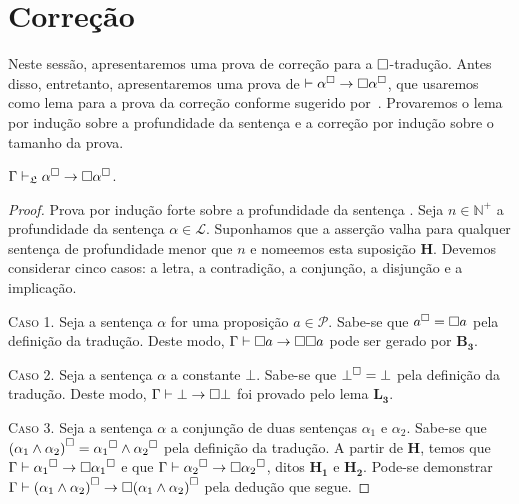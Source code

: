 \section{Correção}

    Neste sessão, apresentaremos uma prova de correção para a $\Box$-tradução. Antes disso, entretanto, apresentaremos uma prova de $\mathrel{\vdash}\alpha^\Box\to\Box\alpha^\Box$, que usaremos como lema para a prova da correção conforme sugerido por~\cite{Troelstra}. Provaremos o lema por indução sobre a profundidade da sentença e a correção por indução sobre o tamanho da prova.

    \begin{tcolorbox}[enhanced jigsaw, breakable, sharp corners, colframe=black, colback=white, boxrule=0.5pt, left=1.5mm, right=1.5mm, top=1.5mm, bottom=1.5mm]
    \begin{theorem}[Estabilidade]\label{square-nec}
        $\Gamma\mathrel{\vdash}_\mathfrak{L}\alpha^\Box\to\Box\alpha^\Box$.

        \begin{proof}
            Prova por indução forte sobre a profundidade da sentença \citep{Troelstra}.
            Seja $n\in\mathbb{N}^+$ a profundidade da sentença $\alpha\in\mathcal{L}$.
            Suponhamos que a asserção valha para qualquer sentença de profundidade menor que $n$ e nomeemos esta suposição $\mathbf{H}$.
            Devemos considerar cinco casos: a letra, a contradição, a conjunção, a disjunção e a implicação.

            \vspace{.5\baselineskip}
            \textsc{Caso 1.}
            Seja a sentença $\alpha$ for uma proposição $a\in\mathcal{P}$.
            Sabe-se que $a^\Box=\Box a$ pela definição da tradução.
            Deste modo, $\Gamma\vdash\Box{a}\to\Box\Box{a}$ pode ser gerado por \hyperref[modal.axiom.modal.3]{$\mathbf{B_3}$}.

            \vspace{.5\baselineskip}
            \textsc{Caso 2.}
            Seja a sentença $\alpha$ a constante $\bot$.
            Sabe-se que $\bot^\Box=\bot$ pela definição da tradução.
            Deste modo, $\Gamma\mathrel{\vdash}\bot\to\Box\bot$ foi provado pelo lema \hyperref[explosion]{$\mathbf{L_3}$}.

            \vspace{.5\baselineskip}
            \textsc{Caso 3.}
            Seja a sentença $\alpha$ a conjunção de duas sentenças $\alpha_1$ e $\alpha_2$.
            Sabe-se que ${(\alpha_1\wedge\alpha_2)}^\Box={\alpha_1}^\Box\wedge{\alpha_2}^\Box$ pela definição da tradução.
            A partir de $\mathbf{H}$, temos que $\Gamma\mathrel{\vdash}{\alpha_1}^\Box\to\Box{\alpha_1}^\Box$ e que $\Gamma\mathrel{\vdash}{\alpha_2}^\Box\to\Box{\alpha_2}^\Box$, ditos $\mathbf{H_1}$ e $\mathbf{H_2}$.
            Pode-se demonstrar $\Gamma\vdash{(\alpha_1\wedge\alpha_2)}^\Box\to\Box{(\alpha_1\wedge\alpha_2)}^\Box$ pela dedução que segue.


\end{proof}
\end{theorem}
\end{tcolorbox}
